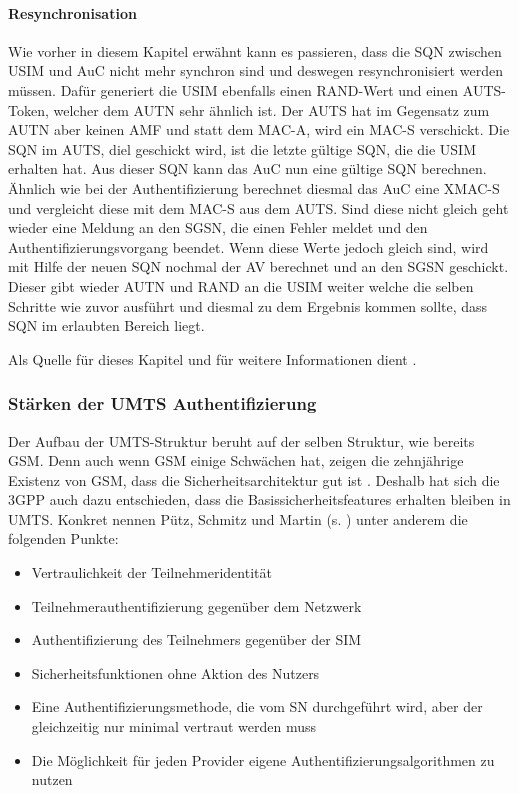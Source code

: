  \paragraph{Resynchronisation}
  Wie vorher in diesem Kapitel erwähnt kann es passieren, dass die SQN zwischen USIM und AuC
  nicht mehr synchron sind und deswegen resynchronisiert werden müssen. Dafür generiert die
  USIM ebenfalls einen RAND-Wert und einen AUTS-Token, welcher dem AUTN sehr ähnlich ist.
  Der AUTS hat im Gegensatz zum AUTN aber keinen AMF und statt dem MAC-A, wird ein MAC-S
  verschickt. Die SQN im AUTS, diel geschickt wird, ist die letzte gültige SQN, die die USIM erhalten
  hat. Aus dieser SQN kann das AuC nun eine gültige SQN berechnen. \\
  Ähnlich wie bei der Authentifizierung berechnet diesmal das AuC eine XMAC-S und vergleicht
  diese mit dem MAC-S aus dem AUTS. Sind diese nicht gleich geht wieder eine Meldung an den
  SGSN, die einen Fehler meldet und den Authentifizierungsvorgang beendet. Wenn diese Werte
  jedoch gleich sind, wird mit Hilfe der neuen SQN nochmal der AV berechnet und an den SGSN
  geschickt. Dieser gibt wieder AUTN und RAND an die USIM weiter welche die selben Schritte
  wie zuvor ausführt und diesmal zu dem Ergebnis kommen sollte, dass SQN im erlaubten
  Bereich liegt.
  
  Als Quelle für dieses Kapitel und für weitere Informationen dient \cite{3gpp.33.102}.
  
 \subsubsection{Stärken der UMTS Authentifizierung}
 Der Aufbau der \ac{UMTS}-Struktur beruht auf der selben Struktur, wie bereits \ac{GSM}.
 Denn auch wenn GSM einige Schwächen hat, zeigen die zehnjährige Existenz von GSM,
 dass die Sicherheitsarchitektur gut ist \cite{putz01}. Deshalb hat sich die \ac{3GPP} auch
 dazu entschieden, dass die Basis\-sicherheits\-features erhalten bleiben in UMTS. Konkret
 nennen Pütz, Schmitz und Martin (s. \cite{putz01}) unter anderem die folgenden Punkte:
 
 \begin{itemize}
  \item Vertraulichkeit der Teilnehmeridentität
  \item Teilnehmerauthentifizierung gegenüber dem Netzwerk
  \item Authentifizierung des Teilnehmers gegenüber der SIM
  \item Sicherheitsfunktionen ohne Aktion des Nutzers
  \item Eine Authentifizierungsmethode, die vom \ac{SN} durchgeführt wird, aber der gleichzeitig nur minimal vertraut werden muss
  \item Die Möglichkeit für jeden Provider eigene Authentifizierungsalgorithmen zu nutzen
 \end{itemize}
 
